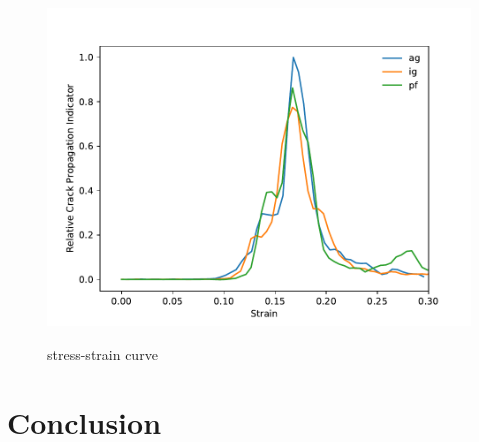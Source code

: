 \documentclass[times,12pt]{elsarticle}
\begin{document}
% 


\begin{figure}[h]
	\centering
	\includegraphics[width=0.7\linewidth]{img/1stdiv}
	\label{fig:surf}
	\caption{stress-strain curve}
\end{figure}


\section{Conclusion}
%


\end{document}
